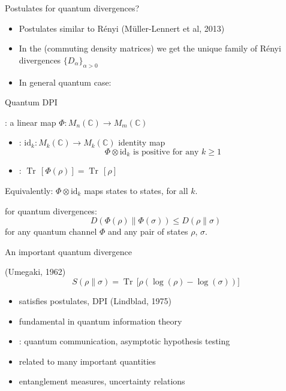 \documentclass[mathserif]{beamer}
\newcommand{\<}{\langle}
\renewcommand{\>}{\rangle}
\newcommand{\Tr}{\operatorname{Tr}\,}
\begin{document}
\begin{frame}{Postulates for quantum divergences?}

\begin{itemize}
\item Postulates similar to R\'enyi {\small (M\"uller-Lennert et al, 2013)}
\vskip 5mm

\item In the   (commuting density matrices) we get 
the unique family of R\'enyi divergences
$\{D_\alpha\}_{\alpha>0}$

\vskip 5mm
\item In general quantum case: 


\end{itemize}


\end{frame}

\begin{frame}{Quantum DPI}


:  a linear map $\Phi: M_n(\mathbb C)\to M_m(\mathbb C)$


\medskip

\begin{itemize}
\item {}:  
$\mathrm{id}_k :M_k(\mathbb C)\to M_k(\mathbb C)$ identity map
\[
\Phi\otimes \mathrm{id}_k\text{ is
positive for any }k\ge 1
\]
\item {}: $\Tr[\Phi(\rho)]=\Tr[\rho]$
\end{itemize}

\medskip
Equivalently: $\Phi\otimes \mathrm{id}_k$ maps states to states, for all $k$.

\bigskip
{} for quantum divergences:
\[
D(\Phi(\rho)\|\Phi(\sigma))\le D(\rho\|\sigma)
\]
for any quantum channel $\Phi$ and any pair of states $\rho$, $\sigma$.
\end{frame}



\begin{frame}{An important quantum divergence}

  {\small (Umegaki, 1962)}
\[
S(\rho\| \sigma)=\Tr\bigl[\rho\left(\log(\rho)-\log(\sigma)\right)\bigr]
\]

\begin{itemize}
\item satisfies postulates, DPI {\small (Lindblad, 1975)}
\vskip 2mm
\item fundamental in quantum information theory
\vskip 2mm
\item {}:  quantum communication, asymptotic
hypothesis testing
\item related to many important quantities
\item entanglement measures, uncertainty relations
\end{itemize}



\end{frame}
\end{document}
